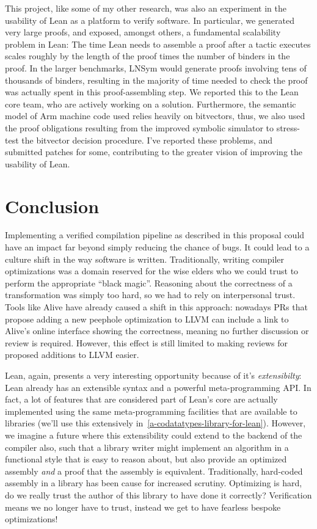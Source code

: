 \documentclass[a4paper]{scrartcl}
\begin{document}
This project, like some of my other research, was also an experiment in the usability of Lean as a platform to verify software.
In particular, we generated very large proofs, and exposed, amongst others, a fundamental scalability problem in Lean:
The time Lean needs to assemble a proof after a tactic executes scales roughly by the length of the proof times the number of binders in the proof.
In the larger benchmarks, LNSym would generate proofs involving tens of thousands of binders,
resulting in the majority of time needed to check the proof was actually spent in this proof-assembling step.
We reported this to the Lean core team, who are actively working on a solution.
Furthermore, the semantic model of Arm machine code used relies heavily on bitvectors, thus, we also used the proof obligations resulting from the improved symbolic simulator to stress-test the bitvector decision procedure. I've reported these problems, and submitted patches for some, contributing to the greater vision of improving the usability of Lean.




\section{Conclusion}

Implementing a verified compilation pipeline as described in this proposal could 
have an impact far beyond simply reducing the chance of bugs. It could lead to a culture
shift in the way software is written. Traditionally, writing compiler
optimizations was a domain reserved for the wise elders who we could
trust to perform the appropriate ``black magic''. Reasoning about the
correctness of a transformation was simply too hard, so we had to rely
on interpersonal trust. Tools like Alive have already caused a shift in
this approach: nowadays PRs that propose adding a new peephole
optimization to LLVM can include a link to Alive's online interface
showing the correctness, meaning no further discussion or review is
required. However, this effect is still limited to making reviews for
proposed additions to LLVM easier.

Lean, again, presents a very interesting opportunity because of it's
\emph{extensibilty}: Lean already has an extensible syntax and a
powerful meta-programming API. In fact, a lot of features that are
considered part of Lean's core are actually implemented using the same
meta-programming facilities that are available to libraries (we'll use
this extensively in~\autoref{a-codatatypes-library-for-lean}). However, we imagine a future where this
extensibility could extend to the backend of the compiler also, such
that a library writer might implement an algorithm in a functional style
that is easy to reason about, but also provide an optimized assembly
\emph{and} a proof that the assembly is equivalent. Traditionally,
hard-coded assembly in a library has been cause for increased scrutiny.
Optimizing is hard, do we really trust the author of this library to
have done it correctly? Verification means we no longer have to trust,
instead we get to have fearless bespoke optimizations!



\end{document}
